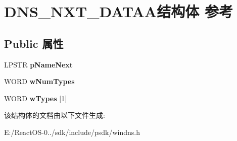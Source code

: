 \hypertarget{struct_d_n_s___n_x_t___d_a_t_a_a}{}\section{D\+N\+S\+\_\+\+N\+X\+T\+\_\+\+D\+A\+T\+A\+A结构体 参考}
\label{struct_d_n_s___n_x_t___d_a_t_a_a}
\subsection*{Public 属性}
\begin{DoxyCompactItemize}
\item 
\mbox{\label{struct_d_n_s___n_x_t___d_a_t_a_a_a21f299a3829ba54705ed134273ede0f9}} 
L\+P\+S\+TR {\bfseries p\+Name\+Next}
\item 
\mbox{\label{struct_d_n_s___n_x_t___d_a_t_a_a_a572178ec2630d2acc91c229721823083}} 
W\+O\+RD {\bfseries w\+Num\+Types}
\item 
\mbox{\label{struct_d_n_s___n_x_t___d_a_t_a_a_a90505d663ffc6967ac506e70d168b5c7}} 
W\+O\+RD {\bfseries w\+Types} \mbox{[}1\mbox{]}
\end{DoxyCompactItemize}


该结构体的文档由以下文件生成\+:\begin{DoxyCompactItemize}
\item 
E\+:/\+React\+O\+S-\/0../sdk/include/psdk/windns.\+h\end{DoxyCompactItemize}
